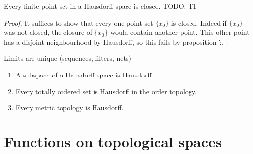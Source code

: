 \begin{proposition}
Every finite point set in a Hausdorff space is closed. TODO: T1
\end{proposition}
\begin{proof}
It suffices to show that every one-point set $\{x_0\}$ is closed. Indeed if $\{x_0\}$ was not closed, the closure of $\{x_0\}$ would contain another point. This other point has a disjoint neighbourhood by Hausdorff, so this fails by proposition ?.
\end{proof}
\begin{proposition}
Limits are unique (sequences, filters, nets)
\end{proposition}
\begin{lemma}
\begin{enumerate}
\item A subspace of a Hausdorff space is Hausdorff.
\item Every totally ordered set is Hausdorff in the order topology.
\item Every metric topology is Hausdorff.
\end{enumerate}
\end{lemma}



\section{Functions on topological spaces}
